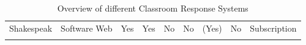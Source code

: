 \begin{landscape}
\begin{center}
\begin{table}[H]
\begin{tabularx}{\paperwidth}{ |X|X|X|X|X|X|X|X|X| }
              Shakespeak            & Software \newline Web & Yes & Yes & \cellcolor{red!25}No & \cellcolor{red!25}No & (Yes) & No & Subscription \\ \Xhline{2\arrayrulewidth}
            \end{tabularx}
            \caption{Overview of different Classroom Response Systems}\label{tab:overview}
        \end{table}
    \end{center}
\end{landscape}




